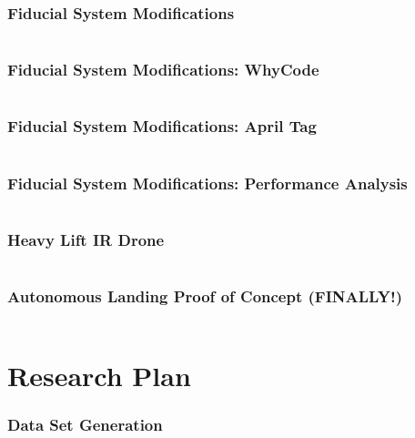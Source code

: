 \documentclass[aspectratio=169]{rubeamer}
\begin{document}
\begin{frame}
  \frametitle{Fiducial System Modifications}
  \begin{columns}
    \centering
  \end{columns}
\end{frame}

\begin{frame}
  \frametitle{Fiducial System Modifications: WhyCode}
  \begin{columns}
    \centering
  \end{columns}
\end{frame}

\begin{frame}
  \frametitle{Fiducial System Modifications: April Tag}
  \begin{columns}
    \centering
  \end{columns}
\end{frame}

\begin{frame}
  \frametitle{Fiducial System Modifications: Performance Analysis}
  \begin{columns}
    \centering
  \end{columns}
\end{frame}

\begin{frame}
  \frametitle{Heavy Lift IR Drone}
  \begin{columns}
    \centering
  \end{columns}
\end{frame}

\begin{frame}
  \frametitle{Autonomous Landing Proof of Concept \textbf{(FINALLY!)}}
  \begin{columns}
    \centering
  \end{columns}
\end{frame}

\section{Research Plan}

\begin{frame}
  \frametitle{Data Set Generation}
  \begin{columns}
    \centering
  \end{columns}
\end{frame}
\end{document}
